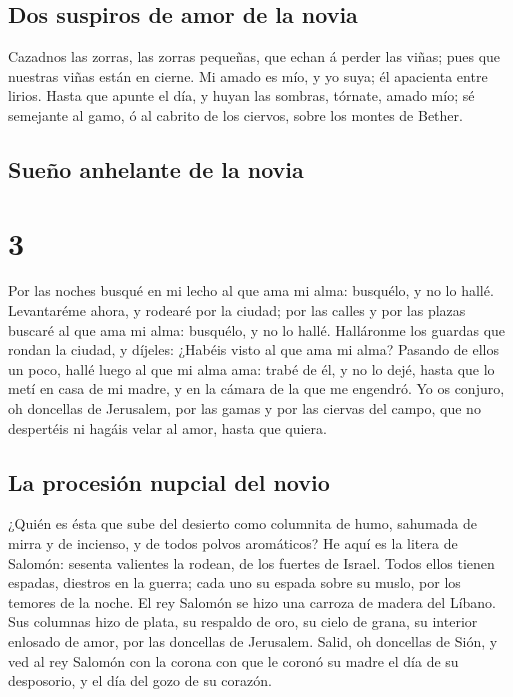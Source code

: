 \hypertarget{dos-suspiros-de-amor-de-la-novia}{%
\subsection{Dos suspiros de amor de la
novia}\label{dos-suspiros-de-amor-de-la-novia}}

 Cazadnos las zorras, las zorras pequeñas, que echan á
perder las viñas; pues que nuestras viñas están en cierne. 
Mi amado es mío, y yo suya; él apacienta entre lirios. 
Hasta que apunte el día, y huyan las sombras, tórnate, amado mío; sé
semejante al gamo, ó al cabrito de los ciervos, sobre los montes de
Bether.

\hypertarget{sueuxf1o-anhelante-de-la-novia}{%
\subsection{Sueño anhelante de la
novia}\label{sueuxf1o-anhelante-de-la-novia}}

\hypertarget{section-2}{%
\section{3}\label{section-2}}

 Por las noches busqué en mi lecho al que ama mi alma:
busquélo, y no lo hallé.  Levantaréme ahora, y rodearé por
la ciudad; por las calles y por las plazas buscaré al que ama mi alma:
busquélo, y no lo hallé.  Halláronme los guardas que rondan
la ciudad, y díjeles: ¿Habéis visto al que ama mi alma? 
Pasando de ellos un poco, hallé luego al que mi alma ama: trabé de él, y
no lo dejé, hasta que lo metí en casa de mi madre, y en la cámara de la
que me engendró.  Yo os conjuro, oh doncellas de Jerusalem,
por las gamas y por las ciervas del campo, que no despertéis ni hagáis
velar al amor, hasta que quiera.

\hypertarget{la-procesiuxf3n-nupcial-del-novio}{%
\subsection{La procesión nupcial del
novio}\label{la-procesiuxf3n-nupcial-del-novio}}

 ¿Quién es ésta que sube del desierto como columnita de
humo, sahumada de mirra y de incienso, y de todos polvos aromáticos?
 He aquí es la litera de Salomón: sesenta valientes la
rodean, de los fuertes de Israel.  Todos ellos tienen
espadas, diestros en la guerra; cada uno su espada sobre su muslo, por
los temores de la noche.  El rey Salomón se hizo una carroza
de madera del Líbano.  Sus columnas hizo de plata, su
respaldo de oro, su cielo de grana, su interior enlosado de amor, por
las doncellas de Jerusalem.  Salid, oh doncellas de Sión, y
ved al rey Salomón con la corona con que le coronó su madre el día de su
desposorio, y el día del gozo de su corazón.


